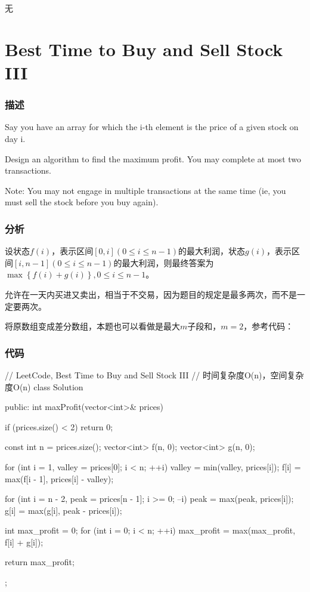 \begindot
\item 无
\myenddot


\section{Best Time to Buy and Sell Stock III} %
\label{sec:best-time-to-buy-and-sell-stock-iii}


\subsubsection{描述}
Say you have an array for which the i-th element is the price of a given stock on day i.

Design an algorithm to find the maximum profit. You may complete at most two transactions.

Note: You may not engage in multiple transactions at the same time (ie, you must sell the stock before you buy again).


\subsubsection{分析}
设状态$f(i)$，表示区间$[0,i](0 \leq i \leq n-1)$的最大利润，状态$g(i)$，表示区间$[i, n-1](0 \leq i \leq n-1)$的最大利润，则最终答案为$\max\left\{f(i)+g(i)\right\},0 \leq i \leq n-1$。

允许在一天内买进又卖出，相当于不交易，因为题目的规定是最多两次，而不是一定要两次。

将原数组变成差分数组，本题也可以看做是最大$m$子段和，$m=2$，参考代码：

\subsubsection{代码}
\begin{Code}
// LeetCode, Best Time to Buy and Sell Stock III
// 时间复杂度O(n)，空间复杂度O(n)
class Solution {
public:
    int maxProfit(vector<int>& prices) {
        if (prices.size() < 2) return 0;

        const int n = prices.size();
        vector<int> f(n, 0);
        vector<int> g(n, 0);

        for (int i = 1, valley = prices[0]; i < n; ++i) {
            valley = min(valley, prices[i]);
            f[i] = max(f[i - 1], prices[i] - valley);
        }

        for (int i = n - 2, peak = prices[n - 1]; i >= 0; --i) {
            peak = max(peak, prices[i]);
            g[i] = max(g[i], peak - prices[i]);
        }

        int max_profit = 0;
        for (int i = 0; i < n; ++i)
            max_profit = max(max_profit, f[i] + g[i]);

        return max_profit;
    }
};
\end{Code}


